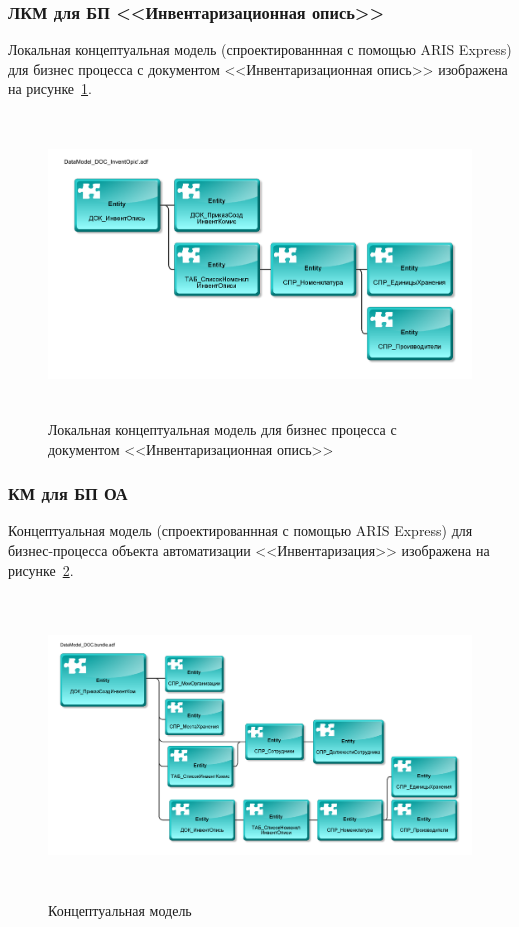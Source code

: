 \newpage

\subsubsection{ЛКМ для БП <<Инвентаризационная опись>>}

Локальная концептуальная модель
(спроектированнная с помощью ARIS Express)
для бизнес процесса с документом <<Инвентаризационная опись>>
изображена на рисунке~\ref{fig:DataModel_DOC_InventOpic}.

\begin{figure}[!h]
    \centering

    \includegraphics[height=8cm]
    {assets/database/DataModel_DOC_InventOpic'.adf.pdf}

    \caption{Локальная концептуальная модель для бизнес процесса с документом <<Инвентаризационная опись>>}

    \label{fig:DataModel_DOC_InventOpic}
\end{figure}

\subsubsection{КМ для БП ОА}

Концептуальная модель
(спроектированнная с помощью ARIS Express)
для бизнес-процесса объекта автоматизации <<Инвентаризация>>
изображена на рисунке~\ref{fig:DataModel_DOC}.

\begin{figure}[!h]
    \centering
    \includegraphics[height=8cm]
        {assets/database/DataModel_DOC.bundle.adf.pdf}
    \caption{Концептуальная модель}
    \label{fig:DataModel_DOC}
\end{figure}

